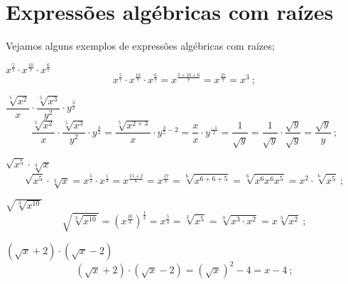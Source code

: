  \newpage
 \section{Expressões algébricas com raízes}
 
 Vejamos alguns exemplos de expressões algébricas com raízes;
 
 \begin{exem}   
   $x^{\frac{5}{7}} \cdot x^{\frac{10}{7}} \cdot x^{\frac{6}{7}}$
\begin{equation}
x^{\frac{5}{7}} \cdot x^{\frac{10}{7}} \cdot x^{\frac{6}{7}}= x^{\frac{5+10+6}{7}}= x^{\frac{21}{7}}= x^3 \ ;
\end{equation}
    \end{exem}
 
 \begin{exem}
   $\dfrac{\sqrt[5]{x^2}}{x} \cdot \dfrac{\sqrt[5]{x^3}}{y^2} \cdot y^{\frac{3}{2}}$
\begin{equation}
\dfrac{\sqrt[5]{x^2}}{x} \cdot \dfrac{\sqrt[5]{x^3}}{y^2} \cdot y^{\frac{3}{2}}= \dfrac{\sqrt[5]{x^{2+3}}}{x} \cdot y^{\frac{3}{2} - 2}= \dfrac{x}{x} \cdot y^{\frac{-1}{2}}= \dfrac{1}{\sqrt{y}}= \dfrac{1}{\sqrt{y}} \cdot \dfrac{\sqrt{y}}{\sqrt{y}}= \dfrac{\sqrt{y}}{y} \ ;
\end{equation}
   \end{exem}
 
 \begin{exem}
    $\sqrt{x^5} \cdot \sqrt[3]{x}$
\begin{equation}
\sqrt{x^5} \cdot \sqrt[3]{x}= x^{\frac{5}{2}} \cdot x^{\frac{1}{3}}= x^{\frac{15+2}{6}} = x^{\frac{17}{6}} = \sqrt[6]{x^{6+6+5}}= \sqrt[6]{x^6 x^6 x^5} =  x^2 \cdot \sqrt[6]{x^5} \ ;
\end{equation}
   \end{exem}
 
 \begin{exem}
   $\sqrt{\sqrt[3]{x^{10}}}$
\begin{equation}
\sqrt{\sqrt[3]{x^{10}}}= (x^{\frac{10}{3}})^{\frac{1}{2}}= x^{\frac{5}{3}}= \sqrt[3]{x^5}= \sqrt[3]{x^3 \cdot x^2}= x \sqrt[3]{x^2} \ ;
\end{equation}
   \end{exem}
 
 \begin{exem}
    $(\sqrt{x} + 2) \cdot (\sqrt{x} - 2)$
\begin{equation}
(\sqrt{x} + 2) \cdot (\sqrt{x} - 2)= (\sqrt{x})^2 - 4= x-4 \ ;
\end{equation}
   \end{exem}
 
